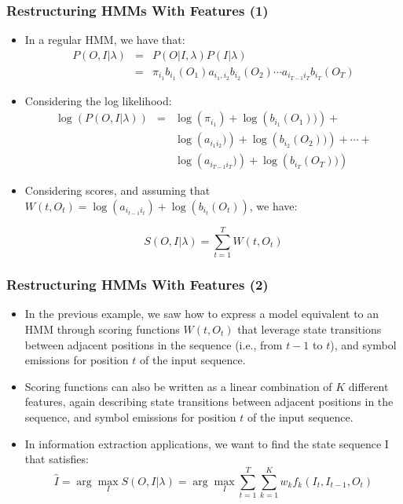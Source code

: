 \documentclass{beamer}
\begin{document}
\begin{frame} \frametitle{Restructuring HMMs With Features (1)}
\begin{itemize}
\item In a regular HMM, we have that:
\begin{eqnarray*}
      P(O,I|\lambda) & = & P(O|I,\lambda)P(I|\lambda) \\
                     & = & \pi_{i_1}b_{i_1}(O_1)a_{i_1,i_2}b_{i_2}(O_2) \dotsb a_{i_{T-1}i_T}b_{i_T}(O_T)
\end{eqnarray*}

\item Considering the log likelihood:
\begin{eqnarray*}
\log\left(P(O,I|\lambda)\right) & = & \log\left(\pi_{i_1}\right) + \log\left(b_{i_1}(O_1))\right) + \\
                                &   &\log\left(a_{i_1i_2})\right) + \log\left(b_{i_2}(O_2))\right) + \dotsb + \\
                                &   & \log\left(a_{i_{T-1}i_T})\right) + \log\left(b_{i_T}(O_T))\right)
\end{eqnarray*}

\item Considering scores, and assuming that $W(t,O_t) = \log(a_{i_{t-1}i_t}) + \log(b_{i_{t}}(O_t))$, we have:

\begin{displaymath}
S(O,I|\lambda) = \sum_{t=1}^{T} W(t,O_t)
\end{displaymath}
\end{itemize}
\end{frame}

\begin{frame} \frametitle{Restructuring HMMs With Features (2)}
\begin{itemize}
\item In the previous example, we saw how to express a model equivalent to an HMM through scoring functions $W(t,O_t)$ that leverage state transitions between adjacent positions in the sequence (i.e., from $t-1$ to $t$), and symbol emissions for position $t$ of the input sequence.

\item Scoring functions can also be written as a linear combination of $K$ different features, again describing state transitions between adjacent positions in the sequence, and symbol emissions for position $t$ of the input sequence.

\item In information extraction applications, we want to find the state sequence I that satisfies:
{\scriptsize
\begin{displaymath}
\hat{I} = \arg \max_I S(O,I|\lambda) = \arg \max_I \sum_{t=1}^T \sum_{k=1}^Kw_kf_k(I_t, I_{t-1}, O_t)
\end{displaymath} }
\end{itemize}


\end{frame}
\end{document}
